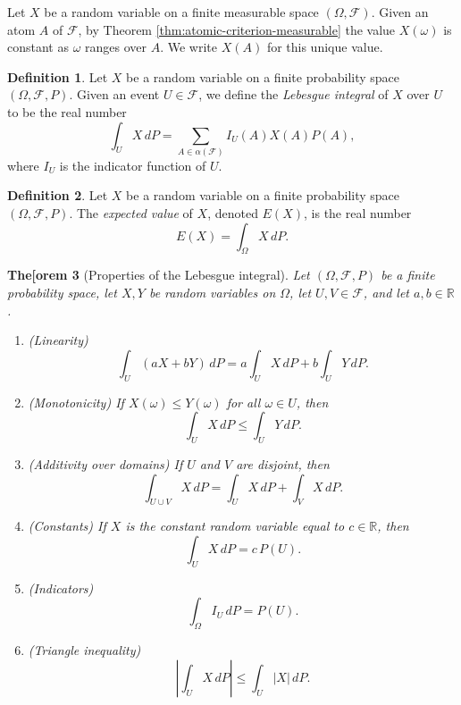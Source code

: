 \documentclass[11pt]{book}
\newtheorem{thm}{The[orem}[section]
\theoremstyle{definition}
\newtheorem{defn}[thm]{Definition}
\numberwithin{equation}{section}
\begin{document}
Let $X$ be a random variable on a finite measurable space $(\Omega, \mathcal{F})$. Given an atom $A$ of $\mathcal{F}$, by Theorem \ref{thm:atomic-criterion-measurable} the value $X(\omega)$ is constant as $\omega$ ranges over $A$. We write $X(A)$ for this unique value.

\begin{defn}
	Let $X$ be a random variable on a finite probability space $(\Omega, \mathcal{F}, P)$. Given an event $U\in \mathcal{F}$, we define the \textit{Lebesgue integral} of $X$ over $U$ to be the real number
	\[
		\int_U X \, dP = \sum_{A\in \alpha(\mathcal{F})} I_U(A)X(A)P(A),
	\]
	where $I_U$ is the indicator function of $U$.
\end{defn}

\begin{defn}
	Let $X$ be a random variable on a finite probability space $(\Omega, \mathcal{F}, P)$. The \textit{expected value} of $X$, denoted $E(X)$, is the real number
	\[
		E(X) = \int_\Omega X \, dP.
	\]
\end{defn}

\begin{thm}[Properties of the Lebesgue integral]\label{thm:integral-properties}
	Let $(\Omega, \mathcal{F}, P)$ be a finite probability space, let $X, Y$ be random variables on $\Omega$, let $U, V \in \mathcal{F}$, and let $a, b \in \mathbb{R}$.
	\begin{enumerate}
		\item (\textit{Linearity})
		      \[
			      \int_U (aX + bY) \, dP = a \int_U X \, dP + b \int_U Y \, dP.
		      \]
		\item (\textit{Monotonicity}) If $X(\omega) \leq Y(\omega)$ for all $\omega \in U$, then
		      \[
			      \int_U X \, dP \leq \int_U Y \, dP.
		      \]
		\item (\textit{Additivity over domains}) If $U$ and $V$ are disjoint, then
		      \[
			      \int_{U \cup V} X \, dP = \int_U X \, dP + \int_V X \, dP.
		      \]
		\item (\textit{Constants}) If $X$ is the constant random variable equal to $c \in \mathbb{R}$, then
		      \[
			      \int_U X \, dP = c \, P(U).
		      \]
		\item (\textit{Indicators})
		      \[
			      \int_\Omega I_U \, dP = P(U).
		      \]
		\item (\textit{Triangle inequality})
		      \[
			      \left| \int_U X \, dP \right| \leq \int_U |X| \, dP.
		      \]
	\end{enumerate}
\end{thm}
\end{document}
